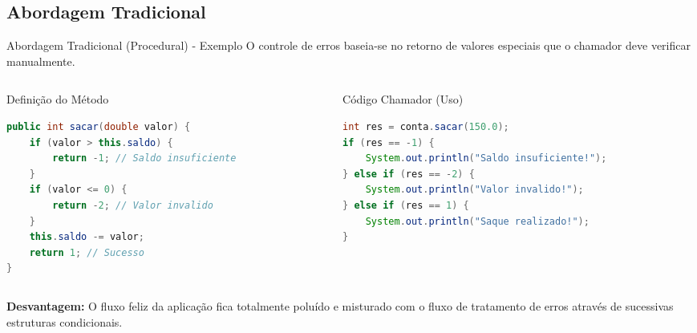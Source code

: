 \documentclass[9pt]{beamer}
\begin{document}
\subsection{Abordagem Tradicional}
\begin{frame}[fragile]{Abordagem Tradicional (Procedural) - Exemplo}
    O controle de erros baseia-se no retorno de valores especiais que o chamador deve verificar manualmente.
    
    \vspace{0.2cm}
    
    \begin{columns}[t]
        \begin{column}{0.48\textwidth}
            \begin{block}{Definição do Método}
                \begin{lstlisting}[language=Java,numbers=none]
public int sacar(double valor) {
    if (valor > this.saldo) {
        return -1; // Saldo insuficiente
    }
    if (valor <= 0) {
        return -2; // Valor invalido
    }
    this.saldo -= valor;
    return 1; // Sucesso
}
\end{lstlisting}
            \end{block}
        \end{column}
        
        \begin{column}{0.48\textwidth}
            \begin{block}{Código Chamador (Uso)}
                \begin{lstlisting}[language=Java,numbers=none]
int res = conta.sacar(150.0);
if (res == -1) {
    System.out.println("Saldo insuficiente!");
} else if (res == -2) {
    System.out.println("Valor invalido!");
} else if (res == 1) {
    System.out.println("Saque realizado!");
}
\end{lstlisting}
            \end{block}
        \end{column}
    \end{columns}
    
    \vspace{0.15cm}
    \scriptsize
    \textbf{Desvantagem:} O fluxo feliz da aplicação fica totalmente poluído e misturado com o fluxo de tratamento de erros através de sucessivas estruturas condicionais.
\end{frame}
\end{document}
